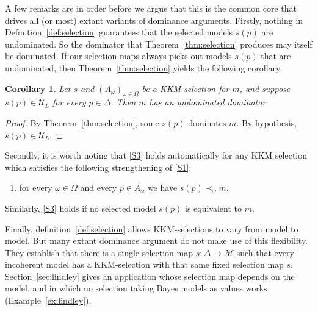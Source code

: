 \documentclass[11pt]{article}
\newcommand{\chg}[1]{{\color{red}#1}}
\newtheorem{corollary}[theorem]{Corollary}
\theoremstyle{definition}
\theoremstyle{remark}
\newcommand{\M}{\mathcal M}
\newcommand{\U}{\mathcal U}
\begin{document}
A few remarks are in order before we argue that this is the common core that drives all (or most) extant variants of dominance arguments. Firstly, nothing in Definition~\ref{def:selection} guarantees that the selected models $s(p)$ are undominated. So the dominator that Theorem~\ref{thm:selection} produces may itself be dominated. If our selection maps always picks out models $s(p)$ that are undominated, then Theorem~\ref{thm:selection} yields the following corollary.



\begin{corollary}\label{cor:undominated-dominators}
Let $s$ and $(A_\omega)_{\omega\in\Omega}$ be a KKM-selection for $m$, and suppose $s(p)\in\U_L$ for every $p\in\Delta$. Then $m$ has an undominated dominator.
\end{corollary}
\begin{proof}
By Theorem~\ref{thm:selection}, some $s(p)$ dominates $m$. By hypothesis, $s(p)\in\U_L$.
\end{proof}

Secondly, it is worth noting that \ref{S3} holds automatically for any KKM selection which satisfies the following strengthening of \ref{S1}:
\begin{enumerate}[label=(S\arabic*$^\prime$),leftmargin=3em]
\item\label{S1'} for every $\omega\in\Omega$ and every $p\in A_\omega$ we have $s(p)\prec_\omega m$.
\end{enumerate}
\noindent Similarly, \ref{S3} holds if no selected model $s(p)$ is equivalent to $m$.


Finally, definition~\ref{def:selection} allows KKM-selections to vary from model to model. But many extant dominance argument do not make use of this flexibility. They establish that there is a single selection map $s:\Delta\to\M$ such that every incoherent model has a KKM-selection with that same fixed selection map $s$. \chg{Section~\ref{sec:lindley} gives an application whose selection map depends on the model, and in which no selection taking Bayes models as values works (Example~\ref{ex:lindley}).} %
\end{document}
